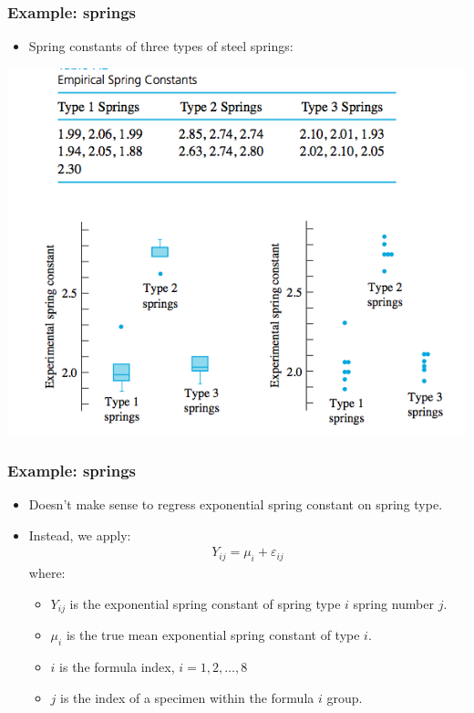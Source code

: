 \documentclass[handout]{beamer}\usepackage[]{graphicx}\usepackage[]{color}
\providecommand{\e}{\varepsilon}
\numberwithin{equation}{section}
\begin{document}
\begin{frame}
\frametitle{Example: springs}
\begin{itemize}
\item Spring constants of three types of steel springs:
\end{itemize}
\begin{center}
 \includegraphics{../../fig/springconst.png}
\end{center}
\end{frame}

\begin{frame}
\frametitle{Example: springs}
\begin{itemize}
\item Doesn't make sense to regress exponential spring constant on spring type.
\pause \item Instead, we apply:
\begin{align*}
Y_{ij} = \mu_{i} + \e_{ij}
\end{align*}
where:
\begin{itemize}
\pause \item $Y_{ij}$ is the exponential spring constant of spring type $i$ spring number $j$.
\pause \item $\mu_{i}$ is the true mean exponential spring constant of type $i$.
\pause \item $i$ is the formula index, $i = 1, 2, \ldots, 8$
\pause \item $j$ is the index of a specimen within the formula $i$ group.
\end{itemize}
\end{itemize}
\end{frame}
\end{document}
